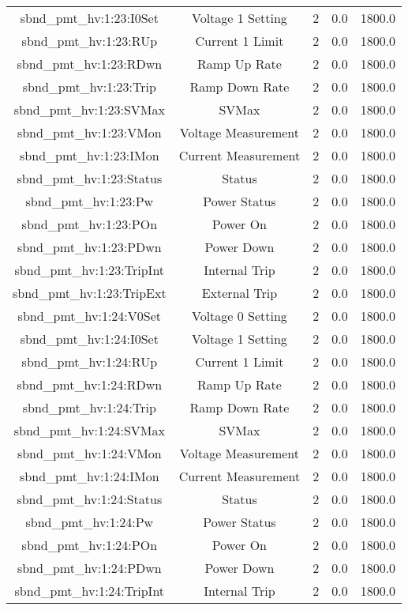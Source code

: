 \begin{center}
\begin{longtable}{c | c c c c }
sbnd\_pmt\_hv:1:23:I0Set & Voltage 1 Setting & 2 & 0.0 & 1800.0\\ 
sbnd\_pmt\_hv:1:23:RUp & Current 1 Limit & 2 & 0.0 & 1800.0\\ 
sbnd\_pmt\_hv:1:23:RDwn & Ramp Up Rate & 2 & 0.0 & 1800.0\\ 
sbnd\_pmt\_hv:1:23:Trip & Ramp Down Rate & 2 & 0.0 & 1800.0\\ 
sbnd\_pmt\_hv:1:23:SVMax & SVMax & 2 & 0.0 & 1800.0\\ 
sbnd\_pmt\_hv:1:23:VMon & Voltage Measurement & 2 & 0.0 & 1800.0\\ 
sbnd\_pmt\_hv:1:23:IMon & Current Measurement & 2 & 0.0 & 1800.0\\ 
sbnd\_pmt\_hv:1:23:Status & Status & 2 & 0.0 & 1800.0\\ 
sbnd\_pmt\_hv:1:23:Pw & Power Status & 2 & 0.0 & 1800.0\\ 
sbnd\_pmt\_hv:1:23:POn & Power On & 2 & 0.0 & 1800.0\\ 
sbnd\_pmt\_hv:1:23:PDwn & Power Down & 2 & 0.0 & 1800.0\\ 
sbnd\_pmt\_hv:1:23:TripInt & Internal Trip & 2 & 0.0 & 1800.0\\ 
sbnd\_pmt\_hv:1:23:TripExt & External Trip & 2 & 0.0 & 1800.0\\ 
sbnd\_pmt\_hv:1:24:V0Set & Voltage 0 Setting & 2 & 0.0 & 1800.0\\ 
sbnd\_pmt\_hv:1:24:I0Set & Voltage 1 Setting & 2 & 0.0 & 1800.0\\ 
sbnd\_pmt\_hv:1:24:RUp & Current 1 Limit & 2 & 0.0 & 1800.0\\ 
sbnd\_pmt\_hv:1:24:RDwn & Ramp Up Rate & 2 & 0.0 & 1800.0\\ 
sbnd\_pmt\_hv:1:24:Trip & Ramp Down Rate & 2 & 0.0 & 1800.0\\ 
sbnd\_pmt\_hv:1:24:SVMax & SVMax & 2 & 0.0 & 1800.0\\ 
sbnd\_pmt\_hv:1:24:VMon & Voltage Measurement & 2 & 0.0 & 1800.0\\ 
sbnd\_pmt\_hv:1:24:IMon & Current Measurement & 2 & 0.0 & 1800.0\\ 
sbnd\_pmt\_hv:1:24:Status & Status & 2 & 0.0 & 1800.0\\ 
sbnd\_pmt\_hv:1:24:Pw & Power Status & 2 & 0.0 & 1800.0\\ 
sbnd\_pmt\_hv:1:24:POn & Power On & 2 & 0.0 & 1800.0\\ 
sbnd\_pmt\_hv:1:24:PDwn & Power Down & 2 & 0.0 & 1800.0\\ 
sbnd\_pmt\_hv:1:24:TripInt & Internal Trip & 2 & 0.0 & 1800.0\\ 

\end{longtable}
\end{center}
